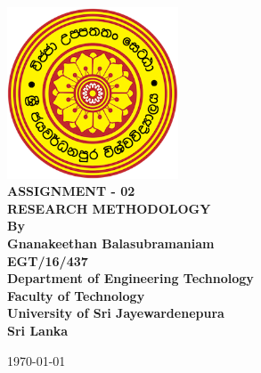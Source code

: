 \documentclass[12pt,a4paper,oneside]{article}
\begin{document}
\begin{titlepage}

\begin{flushright}
\end{flushright}


\center %
{
\includegraphics[width=2in,keepaspectratio]{logo.png}\\[0.5cm]
\fontsize{24pt}{30}\selectfont \textbf{\uppercase{Assignment - 02}}\\[1.5cm]
\fontsize{16}{24}\selectfont \textbf{\uppercase{Research Methodology}}\\[1.5cm]
\fontsize{16pt}{24}\selectfont \textbf{By}\\[0.5cm]
\fontsize{12pt}{12}\selectfont {
}
\vspace*{\fill}
\fontsize{12pt}{12}\selectfont \textbf { Gnanakeethan Balasubramaniam \\ EGT/16/437}\\[0.5cm]


\vspace*{\fill}
\fontsize{12pt}{12}\selectfont \textbf {Department of Engineering Technology \\ Faculty of Technology\\University of Sri Jayewardenepura\\ Sri Lanka \\ }
\vspace*{\fill}

\today
}


\end{titlepage}
\end{document}
